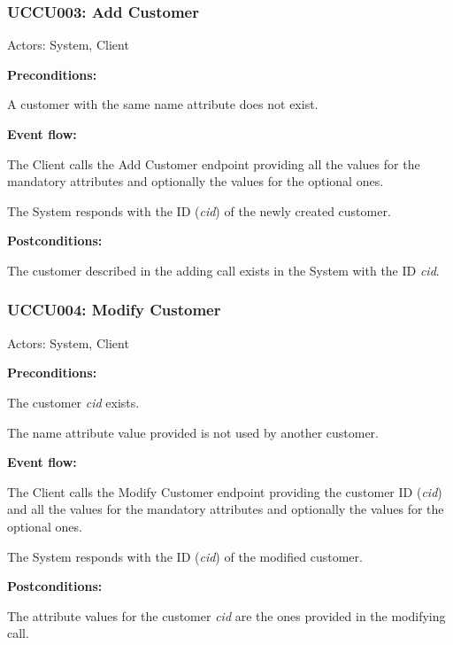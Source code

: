 \begin{ucbox}{\subsubsection{UCCU003: Add Customer}}
\label{UCCU003}

Actors: System, Client

\textbf{Preconditions:}

\ucitem A customer with the same name attribute does not exist.

\textbf{Event flow:}

\ucitem The Client calls the Add Customer endpoint providing all the values for the mandatory attributes and optionally the values for the optional ones.

\ucitem The System responds with the ID (\textit{cid}) of the newly created customer.

\textbf{Postconditions:}

\ucitem The customer described in the adding call exists in the System with the ID \textit{cid}.

\end{ucbox}

\begin{ucbox}{\subsubsection{UCCU004: Modify Customer}}
\label{UCCU004}

Actors: System, Client

\textbf{Preconditions:}

\ucitem The customer \textit{cid} exists.

\ucitem The name attribute value provided is not used by another customer.

\textbf{Event flow:}

\ucitem The Client calls the Modify Customer endpoint providing the customer ID (\textit{cid}) and all the values for the mandatory attributes and optionally the values for the optional 
ones.

\ucitem The System responds with the ID (\textit{cid}) of the modified customer.

\textbf{Postconditions:}

\ucitem The attribute values for the customer \textit{cid} are the ones provided in the modifying call.

\end{ucbox}

